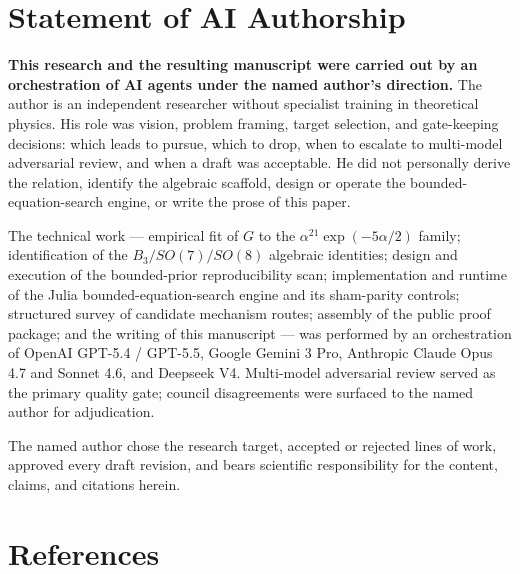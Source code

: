 \documentclass[
  11pt,
  letterpaper,
  twocolumn,
]{article}
\begin{document}
\section{Statement of AI Authorship}\label{ai-authorship}

\noindent\textbf{This research and the resulting manuscript were carried out by an orchestration of AI agents under the named author's direction.} The author is an independent researcher without specialist training in theoretical physics. His role was vision, problem framing, target selection, and gate-keeping decisions: which leads to pursue, which to drop, when to escalate to multi-model adversarial review, and when a draft was acceptable. He did not personally derive the relation, identify the algebraic scaffold, design or operate the bounded-equation-search engine, or write the prose of this paper.

\medskip

The technical work --- empirical fit of \(G\) to the \(\alpha^{21}\exp(-5\alpha/2)\) family; identification of the \(B_3/SO(7)/SO(8)\) algebraic identities; design and execution of the bounded-prior reproducibility scan; implementation and runtime of the Julia bounded-equation-search engine and its sham-parity controls; structured survey of candidate mechanism routes; assembly of the public proof package; and the writing of this manuscript --- was performed by an orchestration of OpenAI GPT-5.4 / GPT-5.5, Google Gemini 3 Pro, Anthropic Claude Opus 4.7 and Sonnet 4.6, and Deepseek V4. Multi-model adversarial review served as the primary quality gate; council disagreements were surfaced to the named author for adjudication.

\medskip

The named author chose the research target, accepted or rejected lines of work, approved every draft revision, and bears scientific responsibility for the content, claims, and citations herein.

\section{References}\label{references}
\end{document}
